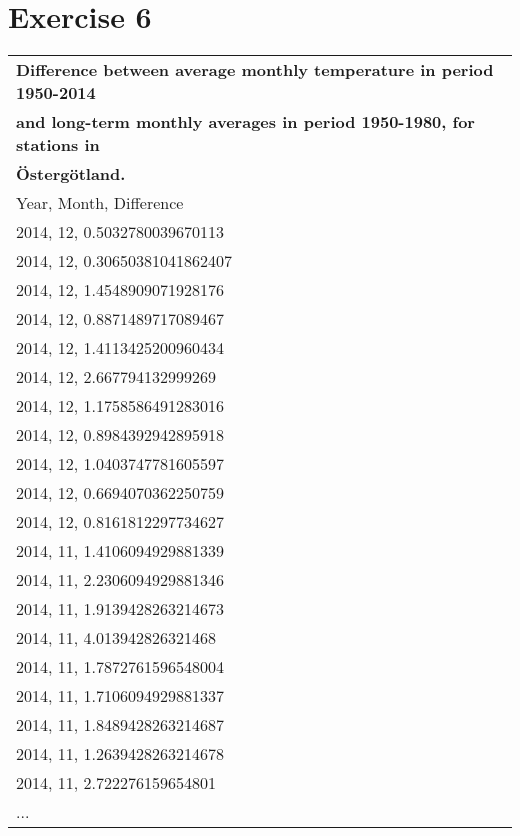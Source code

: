 \documentclass[a4paper,titlepage,12pt]{article}
\begin{document}
\section{Exercise 6}
\begin{tabular}{l}
  \bf Difference between average monthly temperature in period 1950-2014 \\
  \bf and long-term monthly averages in period 1950-1980, for stations in \\
  \bf Östergötland. \\ 
  Year, Month, Difference \\
  \hline
  2014,   12, 0.5032780039670113 \\ 
  2014,   12, 0.30650381041862407 \\ 
  2014,   12, 1.4548909071928176 \\
  2014,   12, 0.8871489717089467 \\
  2014,   12, 1.4113425200960434 \\
  2014,   12, 2.667794132999269 \\
  2014,   12, 1.1758586491283016 \\
  2014,   12, 0.8984392942895918 \\
  2014,   12, 1.0403747781605597 \\
  2014,   12, 0.6694070362250759 \\
  2014,   12, 0.8161812297734627 \\
  2014,   11, 1.4106094929881339 \\
  2014,   11, 2.2306094929881346 \\
  2014,   11, 1.9139428263214673 \\
  2014,   11, 4.013942826321468 \\
  2014,   11, 1.7872761596548004 \\
  2014,   11, 1.7106094929881337 \\
  2014,   11, 1.8489428263214687 \\
  2014,   11, 1.2639428263214678 \\
  2014,   11, 2.722276159654801 \\
  ... \\
\end{tabular}
\end{document}
